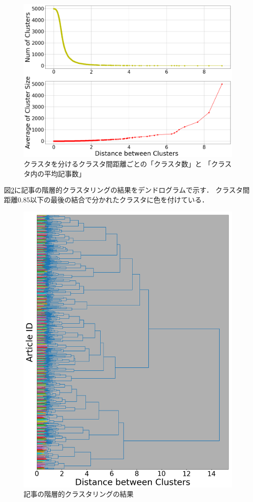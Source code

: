 \documentclass[12pt,a4j]{jreport}
\begin{document}
\begin{figure}[H]
	\centering
	\includegraphics[keepaspectratio, width=120mm]{img/process-06_articles-cluster_threshold-dependencies_reduced-data-to-5000_edit-label_Trim.png}
	\caption{クラスタを分けるクラスタ間距離ごとの「クラスタ数」と
  「クラスタ内の平均記事数」}
	\label{num_and_size_of_clusters_of_articles}
\end{figure}

図\ref{articles_dendrogram}に記事の階層的クラスタリングの結果をデンドログラムで示す．
クラスタ間距離0.85以下の最後の結合で分かれたクラスタに色を付けている．

\begin{figure}[H]
	\centering
	\includegraphics[keepaspectratio, width=120mm]{img/process-06_articles-cluster_color_dendrogram_with-threshold-85_reduced-data-to-5000_Trim.png}
	\caption{記事の階層的クラスタリングの結果}
	\label{articles_dendrogram}
\end{figure}
\end{document}
